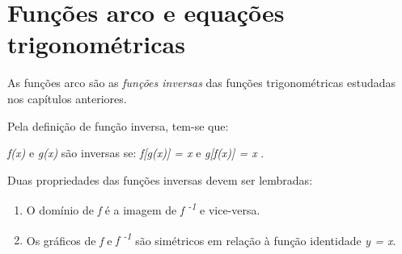 \section{Funções arco e equações trigonométricas}

As funções arco são as \textit{funções inversas} das funções trigonométricas estudadas nos capítulos anteriores.

Pela definição de função inversa, tem-se que:

 \textit{f(x)} e \textit{g(x)} são  inversas se:  \textit{f[g(x)] = x}   e   \textit{g[f(x)] = x} .

Duas propriedades das funções inversas devem ser lembradas:

\begin{enumerate}
    \item O domínio de \textit{f} é a imagem de \textit{f \textsuperscript{-1}} e vice-versa.

    \item Os gráficos de  \textit{f}  e  \textit{f \textsuperscript{-1}}  são simétricos em relação à função identidade \textit{y = x}.
\end{enumerate}

